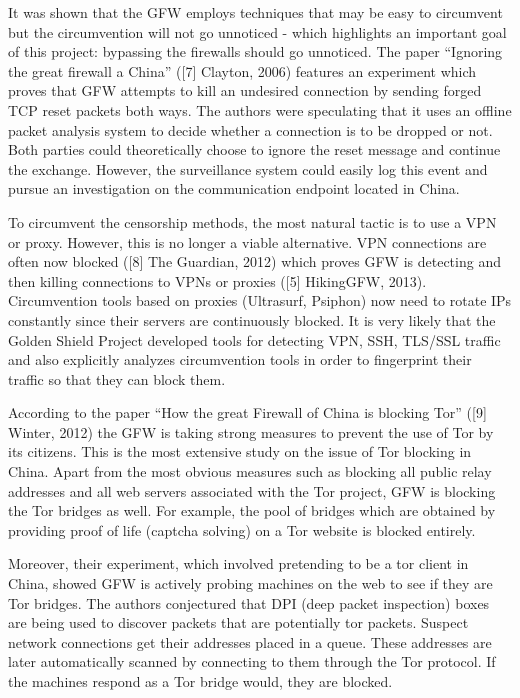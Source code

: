 \documentclass[11pt]{article} %
\begin{document}
It was shown that the GFW employs techniques that may be easy to circumvent but the circumvention will not go unnoticed - which highlights an important goal of this project: bypassing the firewalls should go unnoticed. The paper “Ignoring the great firewall a China” ([7] Clayton,  2006) features an experiment which proves that GFW attempts to kill an undesired connection by sending forged TCP reset packets both ways. The authors were speculating that it uses an offline packet analysis system to decide whether a connection is to be dropped or not. Both parties could theoretically choose to ignore the reset message and continue the exchange. However, the surveillance system could easily log this event and pursue an investigation on the communication endpoint located in China.

To circumvent the censorship methods, the most natural tactic is to use a VPN or proxy. However, this is no longer a viable alternative. VPN connections are often now blocked ([8] The Guardian, 2012) which proves GFW is detecting and then killing connections to VPNs or proxies ([5] HikingGFW, 2013). Circumvention tools based on proxies (Ultrasurf, Psiphon) now need to rotate IPs constantly since their servers are continuously blocked. It is very likely that the Golden Shield Project developed tools for detecting VPN, SSH, TLS/SSL traffic and also explicitly analyzes circumvention tools in order to fingerprint their traffic so that they can block them.

According to the paper “How the great Firewall of China is blocking Tor” ([9] Winter, 2012) the GFW is taking strong measures to prevent the use of Tor by its citizens. This is the most extensive study on the issue of Tor blocking in China. Apart from the most obvious measures such as blocking all public relay addresses and all web servers associated with the Tor project, GFW is blocking the Tor bridges as well. For example, the pool of bridges which are obtained by providing proof of life (captcha solving) on a Tor website is blocked entirely. 

Moreover, their experiment, which involved pretending to be a tor client in China, showed GFW is actively probing machines on the web to see if they are Tor bridges. The authors conjectured that DPI (deep packet inspection) boxes are being used to discover packets that are potentially tor packets. Suspect network connections get their addresses placed in a queue. These addresses are later automatically scanned by connecting to them through the Tor protocol. If the machines respond as a Tor bridge would, they are blocked.
\end{document}
